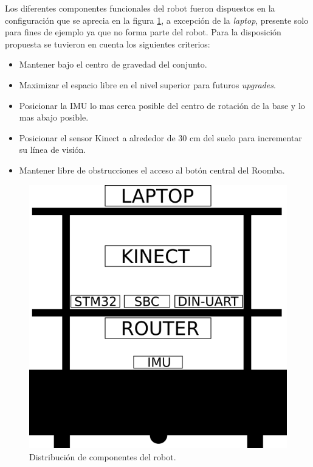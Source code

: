 Los diferentes componentes funcionales del robot fueron dispuestos en la configuración que se aprecia en la figura \ref{fig:lubobotComponentes}, a excepción de la \textit{laptop}, presente solo para fines de ejemplo ya que no forma parte del robot. Para la disposición propuesta se tuvieron en cuenta los siguientes criterios:

\begin{itemize}
  \item Mantener bajo el centro de gravedad del conjunto.
  \item Maximizar el espacio libre en el nivel superior para futuros \textit{upgrades}.
  \item Posicionar la IMU lo mas cerca posible del centro de rotación de la base y lo mas abajo posible.
  \item Posicionar el sensor Kinect a alrededor de 30 cm del suelo para incrementar su línea de visión.
  \item Mantener libre de obstrucciones el acceso al botón central del Roomba.
\end{itemize}

\begin{figure}[ht]
  \centering
  \includegraphics[scale=0.4]{./Figures/distribucion_componentes.png}
  \caption{Distribución de componentes del robot.}
  \label{fig:lubobotComponentes}
\end{figure}

